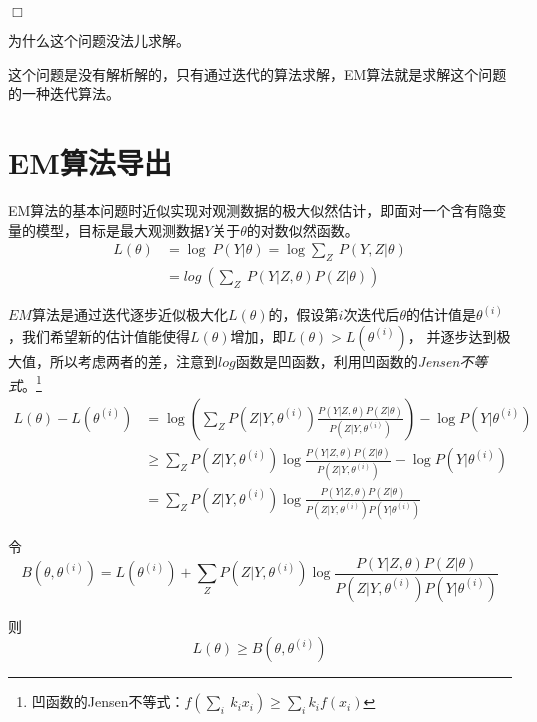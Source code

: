 $\Box$

\begin{question}
    为什么这个问题没法儿求解。
\end{question}

这个问题是没有解析解的，只有通过迭代的算法求解，EM算法就是求解这个问题的一种迭代算法。

\section{EM算法导出}

EM算法的基本问题时近似实现对观测数据的极大似然估计，即面对一个含有隐变量的模型，目标是最大观测数据$Y$关于$\theta$的对数似然函数。
\begin{equation}
    \begin{aligned}
        L(\theta)&=\log\ P(Y|\theta)=\log\sum_{Z}\ P(Y,Z|\theta)\\
        &=log\ \left(\sum_{Z}\ P(Y|Z,\theta)P(Z|\theta)\right)
    \end{aligned}
\end{equation}

$EM$算法是通过迭代逐步近似极大化$L(\theta)$的，假设第$i$次迭代后$\theta$的估计值是$\theta^{(i)}$，我们希望新的估计值能使得$L(\theta)$增加，即$L(\theta)>L(\theta^{(i)})$，
并逐步达到极大值，所以考虑两者的差，注意到$log$函数是凹函数，利用凹函数的\textsl{Jensen不等式}。\footnote{凹函数的Jensen不等式：$f(\sum_{i}\ k_ix_i)\geqslant \sum_{i}k_if(x_i)$}
\begin{equation}
    \begin{aligned}
        L(\theta)-L(\theta^{(i)})&=\log\left(\sum_{Z}P(Z|Y,\theta^{(i)})\frac{P(Y|Z,\theta)P(Z|\theta)}{P(Z|Y,\theta^{(i)})}\right)-\log P(Y|\theta^{(i)})\\
        &\geqslant \sum_{Z}P(Z|Y,\theta^{(i)})\log \frac{P(Y|Z,\theta)P(Z|\theta)}{P(Z|Y,\theta^{(i)})}-\log P(Y|\theta^{(i)})\\
        & = \sum_{Z}P(Z|Y,\theta^{(i)})\log \frac{P(Y|Z,\theta)P(Z|\theta)}{P(Z|Y,\theta^{(i)})P(Y|\theta^{(i)})}
    \end{aligned}
\end{equation}

令
\begin{equation}
    B(\theta,\theta^{(i)}) = L(\theta^{(i)}) + \sum_{Z}P(Z|Y,\theta^{(i)})\log \frac{P(Y|Z,\theta)P(Z|\theta)}{P(Z|Y,\theta^{(i)})P(Y|\theta^{(i)})}
\end{equation}

则
\begin{equation}
    L(\theta)\geqslant B(\theta,\theta^{(i)})
\end{equation}

